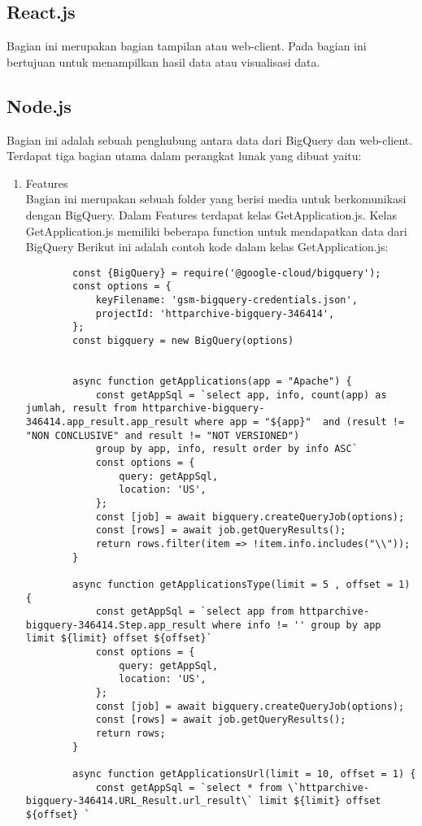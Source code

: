 \subsection{React.js}
Bagian ini merupakan bagian tampilan atau web-client. Pada bagian ini bertujuan untuk menampilkan hasil data atau visualisasi data.

\subsection{Node.js}
Bagian ini adalah sebuah penghubung antara data dari BigQuery dan web-client. Terdapat tiga bagian utama dalam perangkat lunak yang dibuat yaitu:
\begin{enumerate}
	\item Features\\
	Bagian ini merupakan sebuah folder yang berisi media untuk berkomunikasi dengan BigQuery. Dalam Features terdapat kelas GetApplication.js. Kelas GetApplication.js memiliki beberapa function untuk mendapatkan data dari BigQuery Berikut ini adalah contoh kode dalam kelas GetApplication.js:
	\begin{lstlisting}
		const {BigQuery} = require('@google-cloud/bigquery');
		const options = {
			keyFilename: 'gsm-bigquery-credentials.json',
			projectId: 'httparchive-bigquery-346414',
		};
		const bigquery = new BigQuery(options)
		
		
		async function getApplications(app = "Apache") {
			const getAppSql = `select app, info, count(app) as jumlah, result from httparchive-bigquery-346414.app_result.app_result where app = "${app}"  and (result != "NON CONCLUSIVE" and result != "NOT VERSIONED")
			group by app, info, result order by info ASC`
			const options = {
				query: getAppSql,
				location: 'US',
			};
			const [job] = await bigquery.createQueryJob(options);
			const [rows] = await job.getQueryResults();
			return rows.filter(item => !item.info.includes("\\"));
		}
		
		async function getApplicationsType(limit = 5 , offset = 1) {
			const getAppSql = `select app from httparchive-bigquery-346414.Step.app_result where info != '' group by app  limit ${limit} offset ${offset}`
			const options = {
				query: getAppSql,
				location: 'US',
			};
			const [job] = await bigquery.createQueryJob(options);
			const [rows] = await job.getQueryResults();
			return rows;
		}
		
		async function getApplicationsUrl(limit = 10, offset = 1) {
			const getAppSql = `select * from \`httparchive-bigquery-346414.URL_Result.url_result\` limit ${limit} offset ${offset} `
			

\end{lstlisting}
\end{enumerate}
